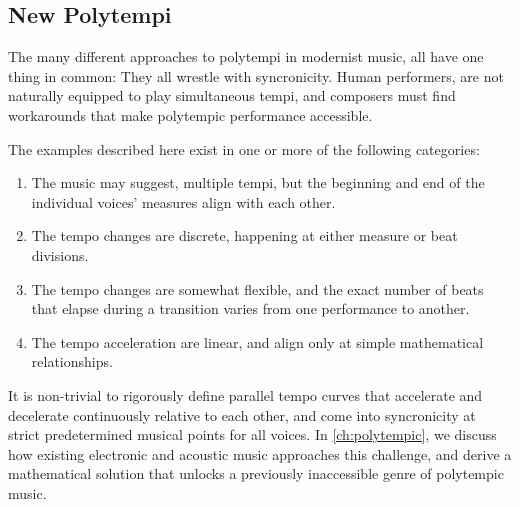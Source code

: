 
\subsection{New Polytempi}
\label{sec:new-polytempi}
The many different approaches to polytempi in modernist music, all
have one thing in common: They all wrestle with syncronicity. Human
performers, are not naturally equipped to play simultaneous tempi, and
composers must find workarounds that make polytempic performance
accessible.

The examples described here exist in one or more of the following
categories:
\begin{enumerate}
\item The music may suggest, multiple tempi, but the beginning and end
  of the individual voices' measures align with each other.
\item The tempo changes are discrete, happening at either measure
  or beat divisions.
\item The tempo changes are somewhat flexible, and  the exact number of
  beats that elapse during a transition varies from one performance to
  another.
\item The tempo acceleration are linear, and align only at simple
  mathematical relationships.
\end{enumerate}
It is non-trivial to rigorously define parallel tempo curves that
accelerate and decelerate continuously relative to each other, and
come into syncronicity at strict predetermined musical points for all
voices. In \autoref{ch:polytempic}, we discuss how existing electronic
and acoustic music approaches this challenge, and derive a
mathematical solution that unlocks a previously inaccessible genre of
polytempic music.

